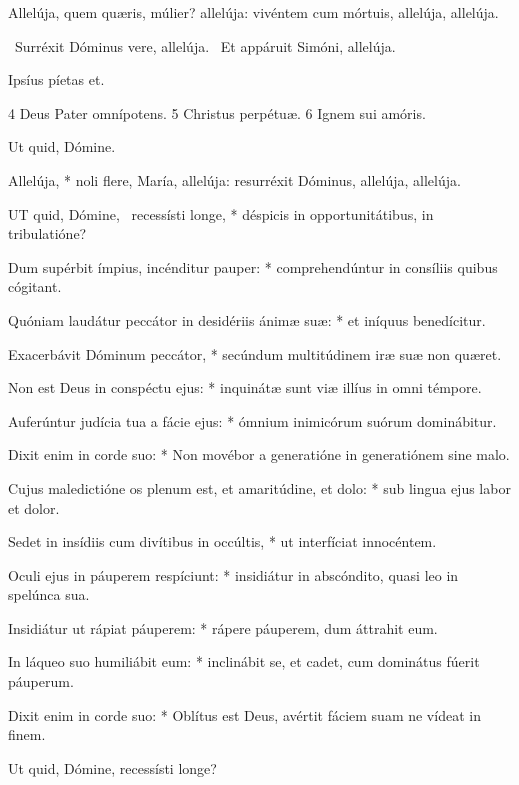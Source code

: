  Allelúja, quem quæris, múlier? allelúja: vivéntem cum mórtuis, allelúja, allelúja.

\V\ Surréxit Dóminus vere, allelúja. \R\ Et appáruit Simóni, allelúja.

 Ipsíus píetas et.

 4 Deus Pater omnípotens. 5 Christus perpétuæ. 6 Ignem sui amóris.



 Ut quid, Dómine. \textdagger


 Allelúja, * noli flere, María, allelúja: resurréxit Dóminus, allelúja, allelúja.


\lettrine[lines=2]{U}{T} quid, Dómine, \textdagger\ recessísti longe, * déspicis in opportunitátibus, in tribulatióne?

Dum supérbit ímpius, incénditur pauper: * comprehendúntur in consíliis quibus cógitant.

Quóniam laudátur peccátor in desidériis ánimæ suæ: * et iníquus benedícitur.

Exacerbávit Dóminum peccátor, * secúndum multitúdinem iræ suæ non quæret.

Non est Deus in conspéctu ejus: * inquinátæ sunt viæ illíus in omni témpore.

Auferúntur judícia tua a fácie ejus: * ómnium inimicórum suórum dominábitur.

Dixit enim in corde suo: * Non movébor a generatióne in generatiónem sine malo.

Cujus maledictióne os plenum est, et amaritúdine, et dolo: * sub lingua ejus labor et dolor.

Sedet in insídiis cum divítibus in occúltis, * ut interfíciat innocéntem.

Oculi ejus in páuperem respíciunt: * insidiátur in abscóndito, quasi leo in spelúnca sua.

Insidiátur ut rápiat páuperem: * rápere páuperem, dum áttrahit eum.

In láqueo suo humiliábit eum: * inclinábit se, et cadet, cum dominátus fúerit páuperum.

Dixit enim in corde suo: * Oblítus est Deus, avértit fáciem suam ne vídeat in finem.

 Ut quid, Dómine, recessísti longe?

